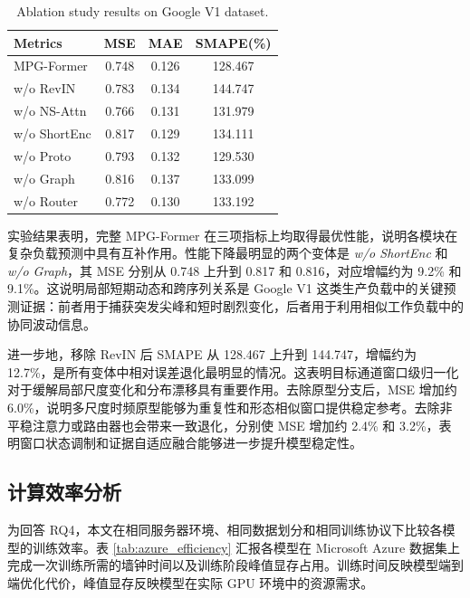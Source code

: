 \documentclass[UTF8]{ctexart}
\begin{document}
\begin{table}[t]
\centering
\caption{Ablation study results on Google V1 dataset.}
\label{tab:ablation}
\small
\setlength{\tabcolsep}{16pt}
\renewcommand{\arraystretch}{1.05}
\begin{tabular}{l|ccc}
\toprule
Metrics & MSE & MAE & SMAPE(\%) \\
\midrule
MPG-Former & 0.748 & 0.126 & 128.467 \\
w/o RevIN & 0.783 & 0.134 & 144.747 \\
w/o NS-Attn & 0.766 & 0.131 & 131.979 \\
w/o ShortEnc & 0.817 & 0.129 & 134.111 \\
w/o Proto & 0.793 & 0.132 & 129.530 \\
w/o Graph & 0.816 & 0.137 & 133.099 \\
w/o Router & 0.772 & 0.130 & 133.192 \\
\bottomrule
\end{tabular}
\end{table}

实验结果表明，完整 MPG-Former 在三项指标上均取得最优性能，说明各模块在复杂负载预测中具有互补作用。性能下降最明显的两个变体是 \textit{w/o ShortEnc} 和 \textit{w/o Graph}，其 MSE 分别从 0.748 上升到 0.817 和 0.816，对应增幅约为 9.2\% 和 9.1\%。这说明局部短期动态和跨序列关系是 Google V1 这类生产负载中的关键预测证据：前者用于捕获突发尖峰和短时剧烈变化，后者用于利用相似工作负载中的协同波动信息。

进一步地，移除 RevIN 后 SMAPE 从 128.467 上升到 144.747，增幅约为 12.7\%，是所有变体中相对误差退化最明显的情况。这表明目标通道窗口级归一化对于缓解局部尺度变化和分布漂移具有重要作用。去除原型分支后，MSE 增加约 6.0\%，说明多尺度时频原型能够为重复性和形态相似窗口提供稳定参考。去除非平稳注意力或路由器也会带来一致退化，分别使 MSE 增加约 2.4\% 和 3.2\%，表明窗口状态调制和证据自适应融合能够进一步提升模型稳定性。

\newpage

\subsection{计算效率分析}

为回答 RQ4，本文在相同服务器环境、相同数据划分和相同训练协议下比较各模型的训练效率。表 \ref{tab:azure_efficiency} 汇报各模型在 Microsoft Azure 数据集上完成一次训练所需的墙钟时间以及训练阶段峰值显存占用。训练时间反映模型端到端优化代价，峰值显存反映模型在实际 GPU 环境中的资源需求。
\end{document}
